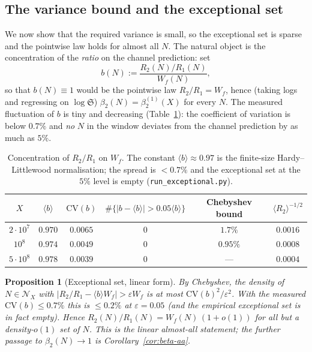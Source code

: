 \documentclass[]{interact}%
\newtheorem{proposition}{Proposition}
\newcommand{\sing}{\mathfrak S}
\begin{document}
\subsection{The variance bound and the exceptional set}
\label{sec:variance}

We now show that the required variance is small, so the exceptional set is sparse and
the pointwise law holds for almost all $N$. The natural object is the concentration of
the \emph{ratio} on the channel prediction: set
\[
  b(N):=\frac{R_2(N)/R_1(N)}{W_f(N)},
\]
so that $b(N)\equiv1$ would be the pointwise law $R_2/R_1=W_f$, hence (taking
logs and regressing on $\log\sing$) $\beta_2(N)=\beta_2^{(1)}(X)$ for every $N$. The
measured fluctuation of $b$ is tiny and decreasing (Table~\ref{tab:conc}): the
coefficient of variation is below $0.7\%$ and \emph{no} $N$ in the window deviates from
the channel prediction by as much as $5\%$.

\begin{table}[h]
\centering
\begin{tabular}{cccccc}
\toprule
$X$ & $\langle b\rangle$ & $\mathrm{CV}(b)$ & $\#\{|b-\langle b\rangle|>0.05\langle b\rangle\}$ & Chebyshev bound & $\langle R_2\rangle^{-1/2}$\\
\midrule
$2\cdot10^{7}$ & $0.970$ & $0.0065$ & $0$ & $1.7\%$ & $0.0016$\\
$10^{8}$       & $0.974$ & $0.0049$ & $0$ & $0.95\%$ & $0.0008$\\
$5\cdot10^{8}$ & $0.978$ & $0.0039$ & $0$ & --- & $0.0004$\\
\bottomrule
\end{tabular}
\caption{Concentration of $R_2/R_1$ on $W_f$. The constant $\langle b\rangle\approx0.97$
is the finite-size Hardy--Littlewood normalisation; the spread is $<0.7\%$ and the
exceptional set at the $5\%$ level is empty (\texttt{run\_exceptional.py}).}
\label{tab:conc}
\end{table}

\begin{proposition}[Exceptional set, linear form]\label{prop:exc}
By Chebyshev, the density of $N\in\mathcal N_X$ with
$|R_2/R_1-\langle b\rangle W_f|>\varepsilon W_f$ is at most
$\mathrm{CV}(b)^2/\varepsilon^2$. With the measured $\mathrm{CV}(b)\le0.7\%$ this is
$\le0.2\%$ at $\varepsilon=0.05$ (and the empirical exceptional set is in fact empty).
Hence $R_2(N)/R_1(N)=W_f(N)\,(1+o(1))$ for all but a density-$o(1)$ set of $N$.
This is the \emph{linear} almost-all statement; the further passage to
$\beta_2(N)\to1$ is Corollary~\ref{cor:beta-aa}.
\end{proposition}
\end{document}
